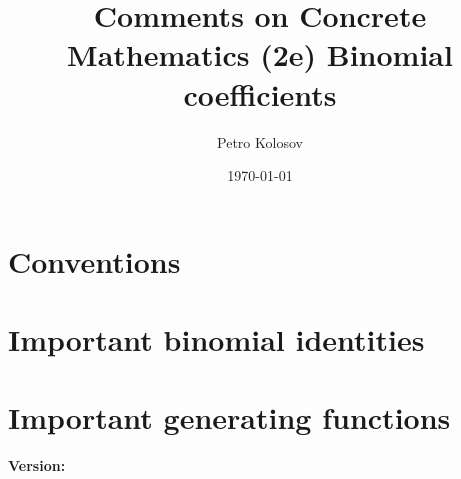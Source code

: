 \documentclass[12pt,letterpaper,oneside,reqno]{amsart}
\title[Comments on Concrete Mathematics (2e) Binomial coefficients]
{Comments on Concrete Mathematics (2e) Binomial coefficients}
\author[Petro Kolosov]{Petro Kolosov}
\date{\today}
\numberwithin{equation}{section}
\begin{document}
    \maketitle

    \tableofcontents


    \section{Conventions}\label{sec:conventions}
    


    \section{Important binomial identities}\label{sec:important-binomial-identities}
    


    \section{Important generating functions}\label{sec:important-generating-functions}
    

    
    
    \noindent \textbf{Version:} 
\end{document}
